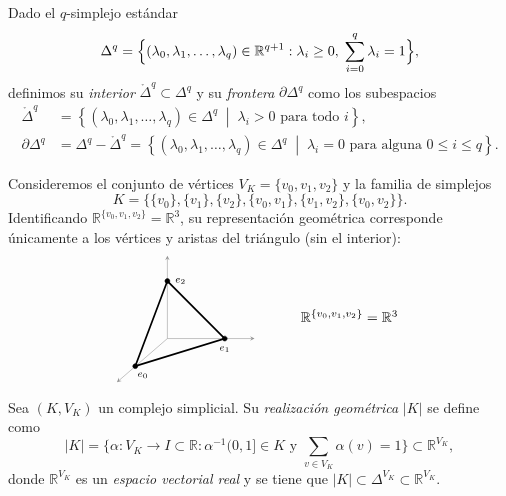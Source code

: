\begin{definicion}
Dado el $q$-simplejo estándar
\[
\Delta^q = \Big\{ (\lambda_0, \lambda_1, \dots, \lambda_q)\in\mathbb{R}^{q+1} : \lambda_i \geq 0, \; \sum_{i=0}^q \lambda_i = 1 \Big\},
\]
definimos su \textit{interior} $\mathring{\Delta}^q \subset \Delta^q$ y su \textit{frontera} $\partial \Delta^q$ como los subespacios
\begin{align*}
\mathring{\Delta}^q &= \left\{ (\lambda_0, \lambda_1, \dots, \lambda_q) \in \Delta^q \;\middle|\; \lambda_i > 0 \text{ para todo } i \right\}, \\[1ex]
\partial \Delta^q &= \Delta^q - \mathring{\Delta}^q = \left\{ (\lambda_0, \lambda_1, \dots, \lambda_q) \in \Delta^q \;\middle|\; \lambda_i = 0 \text{ para alguna } 0 \leq i \leq q \right\}.
\end{align*}
\end{definicion}
\begin{ejemplo}
Consideremos el conjunto de vértices $V_K = \{v_0, v_1, v_2\}$ y la familia de simplejos
\[
K = \big\{ \{v_0\}, \{v_1\}, \{v_2\}, \{v_0, v_1\}, \{v_1, v_2\}, \{v_0, v_2\} \big\}.
\]
Identificando $\mathbb{R}^{\{v_0, v_1, v_2\}} = \mathbb{R}^3$, su representación geométrica corresponde únicamente a los vértices y aristas del triángulo (sin el interior):
\[
\begin{tikzpicture}[baseline=0.35cm, scale=1.15, >=stealth]
    \coordinate (O) at (0, 0);
    \coordinate (E0) at (-0.7, -0.6);
    \coordinate (E1) at (1.25, 0);
    \coordinate (E2) at (0, 1.25);

    \draw[->, thin, gray!85] (O) -- (-1.1, -0.95);
    \draw[->, thin, gray!85] (O) -- (1.9, 0);
    \draw[->, thin, gray!85] (O) -- (0, 1.8);

    \draw[very thick] (E0) -- (E1) -- (E2) -- cycle;

    \filldraw (E0) circle (1.5pt) node[below right, xshift=-2pt, yshift=-1pt] {$\scriptstyle e_0$};
    \filldraw (E1) circle (1.5pt) node[below=2pt] {$\scriptstyle e_1$};
    \filldraw (E2) circle (1.5pt) node[right=2pt] {$\scriptstyle e_2$};

    \node[right] at (2.8, 0.5) {$\mathbb{R}^{\{v_0, v_1, v_2\}} = \mathbb{R}^3$};
\end{tikzpicture}
\]
\end{ejemplo}

\begin{definicion}
Sea $(K, V_K)$ un complejo simplicial. Su \textit{realización geométrica} $|K|$ se define como
\[
|K| = \Big\{ \alpha \colon V_K \to I \subset \mathbb{R} : \alpha^{-1}(0, 1] \in K \text{ y } \sum_{v \in V_K} \alpha(v) = 1 \Big\} \subset \mathbb{R}^{V_K},
\]
donde $\mathbb{R}^{V_K}$ es un \textit{espacio vectorial real} y se tiene que $|K| \subset \Delta^{V_K} \subset \mathbb{R}^{V_K}$.
\end{definicion}

